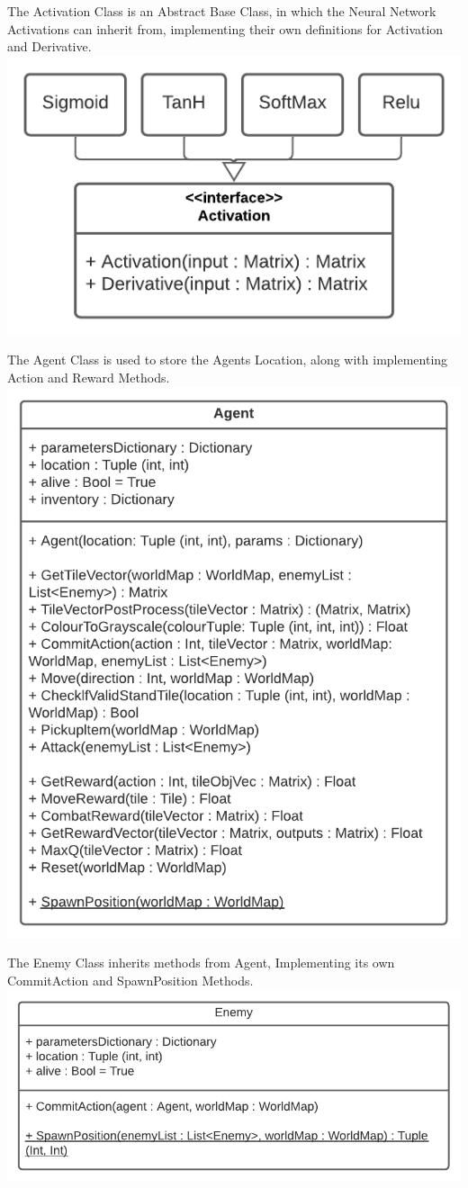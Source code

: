 \begin{flushleft}
\begin{center}
                The Activation Class is an Abstract Base Class, in which the Neural Network Activations can inherit from, implementing
                their own definitions for Activation and Derivative. \\
                \includegraphics[width=.65\textwidth]{Images/Design/Classes/Activation.png} \\
                \vspace{0.2cm}

                The Agent Class is used to store the Agents Location, along with implementing Action and Reward Methods. \\
                \includegraphics[width=.65\textwidth]{Images/Design/Classes/Agent.png} \\
                \vspace{0.2cm}

                The Enemy Class inherits methods from Agent, Implementing its own CommitAction and SpawnPosition Methods. \\
                \includegraphics[width=.80\textwidth]{Images/Design/Classes/Enemy.png} \\
                \vspace{0.2cm}


\end{center}
\end{flushleft}
